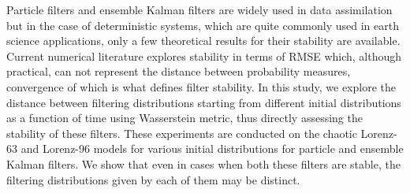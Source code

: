 
 Particle filters and ensemble Kalman filters are widely used in data assimilation but in the case of deterministic systems, which are quite commonly used in earth science applications, only a few theoretical results for their stability are available. Current numerical literature explores stability in terms of RMSE which, although practical, can not represent the distance between probability measures, convergence of which is what defines filter stability. In this study, we explore the distance between filtering distributions starting from different initial distributions as a function of time using Wasserstein metric, thus directly assessing the stability of these filters. These experiments are conducted on the chaotic Lorenz-63 and Lorenz-96 models for various initial distributions for particle and ensemble Kalman filters. We show that even in cases when both these filters are stable, the filtering distributions given by each of them may be distinct.
